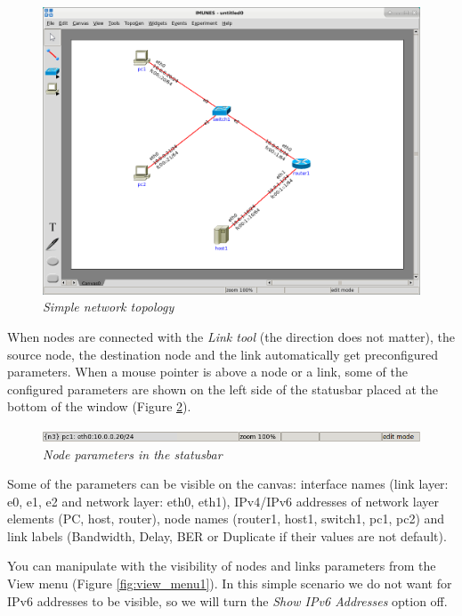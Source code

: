 \begin{figure}[H]
\centering
\vspace{10pt}
\includegraphics[width=\textwidth]{./images/simple_topology.png}
\caption{\emph{Simple network topology}}
\label{fig:simple_topology}
\end{figure}

When nodes are connected with the \emph{Link tool} (the direction does not
matter), the source node, the destination node and the link automatically get
preconfigured parameters. When a mouse pointer is above a node or a link, some
of the configured parameters are shown on the left side of the statusbar placed
at the bottom of the window (Figure \ref{fig:statusbar_node}).

\begin{figure}[H]
\centering
\vspace{10pt}
\includegraphics[width=\textwidth]{./images/statusbar1.png}
\caption{\emph{Node parameters in the statusbar}}
\label{fig:statusbar_node}
\end{figure}

Some of the parameters can be visible on the canvas: interface names (link
layer: e0, e1, e2 and network layer: eth0, eth1), IPv4/IPv6 addresses of
network layer elements (PC, host, router), node names (router1, host1, switch1,
pc1, pc2) and link labels (Bandwidth, Delay, BER or Duplicate if their values
are not default).

You can manipulate with the visibility of nodes and links parameters from the
View menu (Figure \ref{fig:view_menu1}). In this simple scenario we do not want
for IPv6 addresses to be visible, so we will turn the \emph{Show IPv6
Addresses} option off.

